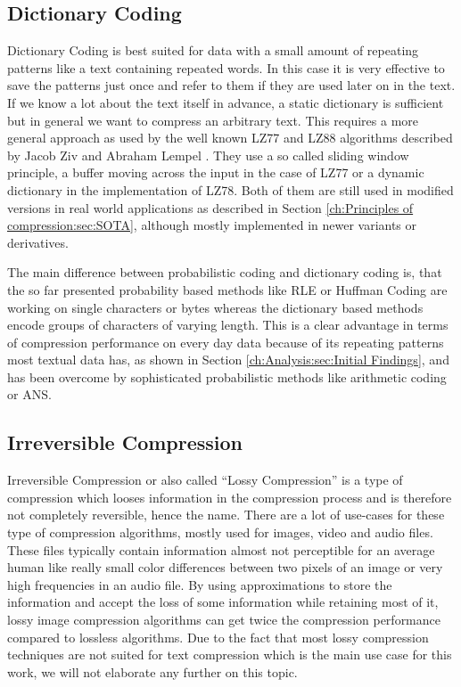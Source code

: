 \subsection{Dictionary Coding}
\par{
Dictionary Coding is best suited for data with a small amount of repeating patterns like a text containing repeated words. In this case it is very effective to save the patterns just once and refer to them if they are used later on in the text. If we know a lot about the text itself in advance, a static dictionary is sufficient but in general we want to compress an arbitrary text. This requires a more general approach as used by the well known LZ77 and LZ88 algorithms described by Jacob Ziv and Abraham Lempel \cite{lz}. They use a so called sliding window principle, a buffer moving across the input in the case of LZ77 or a dynamic dictionary in the implementation of LZ78. Both of them are still used in modified versions in real world applications as described in Section \ref{ch:Principles of compression:sec:SOTA}, although mostly implemented in newer variants or derivatives.
}
\par{
The main difference between probabilistic coding and dictionary coding is, that the so far presented probability based methods like RLE or Huffman Coding are working on single characters or bytes whereas the dictionary based methods encode groups of characters of varying length. This is a clear advantage in terms of compression performance on every day data because of its repeating patterns most textual data has, as shown in Section \ref{ch:Analysis:sec:Initial Findings}, and has been overcome by sophisticated probabilistic methods like arithmetic coding or ANS.
}


\subsection{Irreversible Compression}
\par{
Irreversible Compression or also called \enquote{Lossy Compression} is a type of compression which looses information in the compression process and is therefore not completely reversible, hence the name. There are a lot of use-cases for these type of compression algorithms, mostly used for images, video and audio files. These files typically contain information almost not perceptible for an average human like really small color differences between two pixels of an image or very high frequencies in an audio file. By using approximations to store the information and accept the loss of some information while retaining most of it, lossy image compression algorithms can get twice the compression performance compared to lossless algorithms. Due to the fact that most lossy compression techniques are not suited for text compression which is the main use case for this work, we will not elaborate any further on this topic.
}



